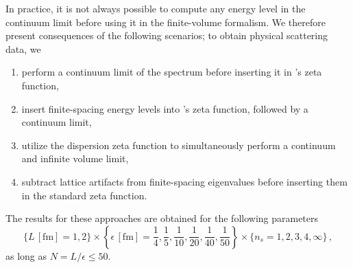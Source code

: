 In practice, it is not always possible to compute any energy level in the continuum limit before using it in the finite-volume \Luscher formalism.
We therefore present consequences of the following scenarios; to obtain physical scattering data, we
\begin{enumerate}
	\item perform a continuum limit of the spectrum before inserting it in \Luscher's zeta function,
	\item insert finite-spacing energy levels into \Luscher's zeta function, followed by a continuum limit,
	\item utilize the dispersion zeta function to simultaneously perform a continuum and infinite volume limit,
	\item subtract lattice artifacts from finite-spacing eigenvalues before inserting them in the standard zeta function.
\end{enumerate}
The results for these approaches are obtained for the following parameters
\begin{equation}
    \{ L \,[\mathrm{fm}]= 1, 2 \}
    \times \left\{ \epsilon \,[\mathrm{fm}] = \frac{1}{4}, \frac{1}{5}, \frac{1}{10}, \frac{1}{20}, \frac{1}{40}, \frac{1}{50} \right\}
    \times \{ n_s = 1, 2, 3, 4, \infty \}
    \, ,
\end{equation}
as long as $N = L / \epsilon \leq 50$.




